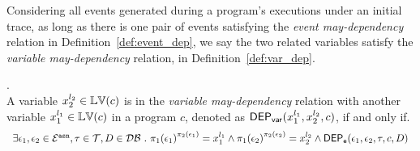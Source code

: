 {Considering 
all events generated during a program's executions
under an initial trace,
as long as there is one pair of events satisfying the \emph{event may-dependency} relation in Definition~\ref{def:event_dep}, 
 we say the two 
related
variables satisfy the \emph{variable may-dependency} relation, in Definition~\ref{def:var_dep}.
}

\begin{defn}.
  \label{def:var_dep}
  \\
  A variable ${x}_2^{l_2} \in \mathbb{LV}(c)$ is in the \emph{variable may-dependency} relation with another
  variable ${x}_1^{l_1} \in \mathbb{LV}(c)$ in a program ${c}$, denoted as 
  $\mathsf{DEP_{var}}({x}_1^{l_1}, {x}_2^{l_2}, {c})$, if and only if.
\[
  \begin{array}{l}
\exists \event_1, \event_2 \in \eventset^{\asn}, \trace \in \mathcal{T} , D \in \dbdom \sthat
\pi_{1}{(\event_1)}^{\pi_{2}{(\event_1)}} = {x}_1^{l_1}
\land
\pi_{1}{(\event_2)}^{\pi_{2}{(\event_2)}} = {x}_2^{l_2}%
\land 
\eventdep(\event_1, \event_2, \trace, c, D) 
  \end{array}
\]  %
\end{defn}